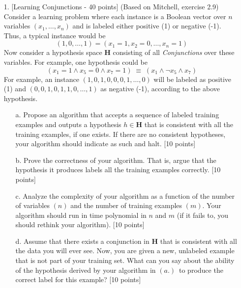 \begin{enumerate}

\item[1.] [Learning Conjunctions - 40 points] (Based on Mitchell, exercise 2.9)\\
Consider a learning problem where each instance is a Boolean vector over $n$
variables $(x_1, \ldots, x_n)$ and is labeled either positive (1) or negative
(-1).  Thus, a typical instance would be
\begin{displaymath}
(1, 0, \ldots, 1) = (x_1 = 1, x_2 = 0, \ldots, x_n = 1)
\end{displaymath}
Now consider a hypothesis space ${\mathbf H}$ consisting of all {\em
  Conjunctions} over these variables.  For example, one hypothesis
could be
\begin{displaymath}
(x_1 = 1 \land x_5 = 0 \land x_7 = 1) \; \equiv \; (x_1 \land \neg x_5 \land x_7)
\end{displaymath}
For example, an instance $(1, 0, 1, 0, 0, 0, 1, \ldots, 0)$ will be labeled
as positive (1) and $(0, 0, 1, 0, 1, 1, 0, \ldots, 1)$ as negative (-1),
according to the above hypothesis.

\begin{enumerate}
\item[a.]
Propose an algorithm that accepts a sequence of labeled training examples
and outputs a hypothesis $h \in \mathbf{H}$ that is consistent with all the training examples,
if one exists.  If there are no consistent hypotheses, your algorithm should
indicate as such and halt. [10 points]

\item[b.]
Prove the correctness of your algorithm.  That is, argue that the hypothesis
it produces labels all the training examples correctly. [10 points]

\item[c.]
Analyze the complexity of your algorithm as a function of the number of
variables $(n)$ and the number of training examples $(m)$.  Your algorithm
should run in time polynomial in $n$ and $m$ (if it fails to, you should rethink your algorithm). [10 points]

\item[d.]  Assume that there exists a conjunction in ${\mathbf H}$
  that is consistent with all the data you will ever see.  Now, you are
  given a new, unlabeled example that is not part of your training
  set.  What can you say about the ability of the hypothesis derived
  by your algorithm in $(a.)$~to produce the correct label for this
  example?  [10 points]
  

\end{enumerate}
\end{enumerate}
